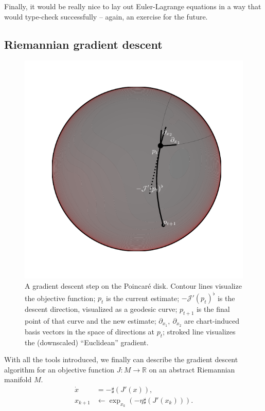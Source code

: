Finally, it would be really nice to lay out Euler-Lagrange equations in a way
that would type-check successfully -- again, an exercise for the future.

\subsection*{Riemannian gradient descent}


\begin{figure}[h]\centering
\includegraphics[width=.9\linewidth]{art/rgd-update.pdf}
\caption{A gradient descent step on the Poincar\'e disk.
Contour lines visualize the objective function; \( p_t \) is the current estimate;
    \( -\mathcal{J}'(p_t)^\flat \) is the descent direction, visualized as a geodesic curve;
\( p_{t+1} \) is the final point of that curve and the new estimate;
\( \partial_{x_1},~\partial_{x_2} \) are chart-induced basis vectors in the
    space of directions at \( p_t \);
stroked line visualizes the (downscaled) ``Euclidean'' gradient.
}
\label{fig:rgdStep}
\end{figure}

With all the tools introduced, we finally can describe the gradient descent
algorithm for an objective function \( J: M \to \mathbb{R} \) on an abstract
Riemannian manifold \( M \).
\begin{align*}
\dot x &= -\sharp(J'(x)),\\
x_{k+1} &\leftarrow \exp_{x_k}(-\eta \sharp(J'(x_k))).
\end{align*}

